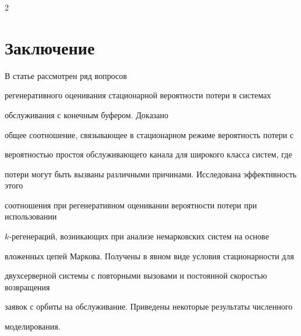 \begin{multicols}{2}
\begin{center}
\end{center}





















\addtocounter{table}{1}








\section{Заключение} 





В статье рассмотрен ряд   вопросов


 регенеративного оценивания  стационарной вероятности потери в системах


обслуживания с  конечным буфером. Доказано


 общее соотношение,  связывающее в стационарном режиме вероятность потери с


ве\-ро\-ят\-ностью простоя обслуживающего канала  для широкого класса систем, где


потери могут быть вызваны  различными причинами.  Исследована эффективность этого


соотношения при регенеративном оценивании вероятности потери при использовании


$k$-регенераций, возникающих при анализе немарковских систем на основе


вложенных цепей Маркова. Получены в явном виде условия стационарности для


двухсерверной системы с повторными вызовами и постоянной скоростью возвращения


заявок с орбиты на обслуживание. Приведены некоторые  результаты численного


моделирования.





{\small\frenchspacing


{%


}}
\end{multicols}
